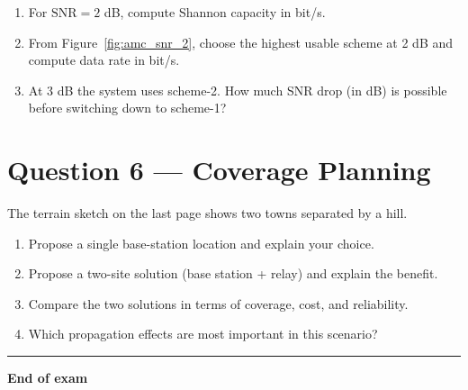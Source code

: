 \documentclass[11pt,a4paper]{article}
\begin{document}
\begin{enumerate}[label=\alph*)]
    \item For $\mathrm{SNR}=2$ dB, compute Shannon capacity in bit/s.
    \item From Figure~\ref{fig:amc_snr_2}, choose the highest usable scheme at 2 dB and compute data rate in bit/s.
    \item At 3 dB the system uses scheme-2. How much SNR drop (in dB) is possible before switching down to scheme-1?
\end{enumerate}

\section*{Question 6 --- Coverage Planning}
The terrain sketch on the last page shows two towns separated by a hill.

\begin{enumerate}[label=\alph*)]
    \item Propose a single base-station location and explain your choice.
    \item Propose a two-site solution (base station + relay) and explain the benefit.
    \item Compare the two solutions in terms of coverage, cost, and reliability.
    \item Which propagation effects are most important in this scenario?
\end{enumerate}

\vspace{0.6cm}
\hrule
\vspace{0.3cm}
\textbf{End of exam}


\clearpage
\label{LastPage}
\end{document}
